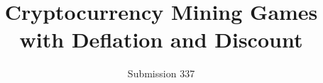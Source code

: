 \documentclass[a4paper,english,cleveref, autoref,numberwithinsect,subcaption]{lipics-v2019}
\begin{document}
\title{Cryptocurrency Mining Games with Deflation and Discount}

\iffalse
\author{Marcelo Arenas\inst{1} \and
Juan Reutter\inst{1} \and
Etienne Toussaint\inst{2} \and
Mart\'in Ugarte\inst{1} \and
Francisco Vial\inst{1} \and
Domagoj Vrgo\v{c}\inst{1}\\
\email{\{marenas,jreutter,dvrgoc\}@ing.puc.cl}\\
\email{s1778281@sms.ed.ac.uk}\\
\email{martin@martinugarte.com}\\
\email{fvial@grupolvt.cl}}{}{}{}

\institute{PUC \& IMFD Chile \and
University of Edinburgh
\email{lncs@springer.com}}
\fi
\author{Submission 337}{}{}{}{}

\maketitle












\newpage

\appendix


\end{document}

